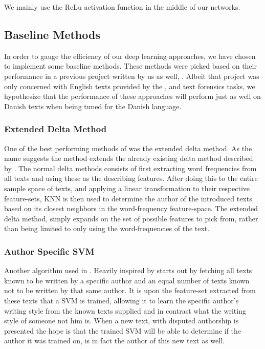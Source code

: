 We mainly use the \gls{ReLu} activation function in the middle of our networks.


\subsection{Baseline Methods}

In order to gauge the efficiency of our deep learning approaches, we have
chosen to implement some baseline methods. These methods were picked
based on their performance in a previous project written by us as well,
\cite{US}. Albeit that project was only concerned with English texts
provided by the \cite{pan:2015}, and \cite{pan:2014} text forensics tasks,
we hypothesize that the performance of these approaches will perform just
as well on Danish texts when being tuned for the Danish language.


\subsubsection{Extended Delta Method}

One of the best performing methods of \cite{US} was the extended delta method.
As the name suggests the method extends the already existing delta method
described by \cite{evert2015towards}. The normal delta methods consists of first
extracting word frequencies from all texts and using these as the describing
features. After doing this to the entire sample space of texts, and applying a
linear transformation to their respective feature-sets, \gls{KNN} is then used
to determine the author of the introduced texts based on its closest neighbors
in the word-frequency feature-space. The extended delta method, simply expands
on the set of possible features to pick from, rather than being limited to only
using the word-frequencies of the text.


\subsubsection{Author Specific SVM}

Another algorithm used in \cite{US}. Heavily inspired by \cite{hansen2014}
starts out by fetching all texts known to be written by a specific author and an
equal number of texts known not to be written by that same author. It is upon
the feature-set extracted from these texts that a \gls{SVM} is trained, allowing
it to learn the specific author's writing style from the known texts supplied
and in contrast what the writing style of someone not him is. When a new text,
with disputed authorship is presented the hope is that the trained \gls{SVM}
will be able to determine if the author it was trained on, is in fact the author
of this new text as well.


